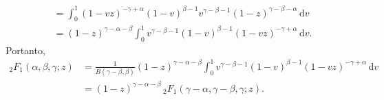 \documentclass[a4paper,12pt, leqno, answers]{exam}
\begin{document}
\begin{questions}
\begin{parts}
\begin{solution}
\begin{align*}
                &= \int_0^1 (1 - vz)^{-\gamma + \alpha} (1 - v)^{\beta - 1} v^{\gamma - \beta - 1} (1 - z)^{\gamma - \beta - \alpha} \,\mathrm{d}v \\
                &= (1 - z)^{\gamma - \alpha - \beta} \int_0^1 v^{\gamma - \beta - 1} (1 - v)^{\beta - 1} (1 - vz)^{- \gamma + \alpha} \,\mathrm{d}v.
            \end{align*}
            Portanto,
            \begin{align*}
                {}_2F_1(\alpha, \beta, \gamma; z) &= \frac{1}{B(\gamma - \beta, \beta)} (1-z)^{\gamma - \alpha - \beta} \int_0^1 v^{\gamma - \beta - 1} (1 - v)^{\beta - 1} (1 - vz)^{-\gamma + \alpha} \,\mathrm{d}v \\
                &= (1 - z)^{\gamma - \alpha - \beta} \,_2F_1(\gamma - \alpha, \gamma - \beta, \gamma; z).
            \end{align*}
        \end{solution}


\end{parts}
\end{questions}
\end{document}
